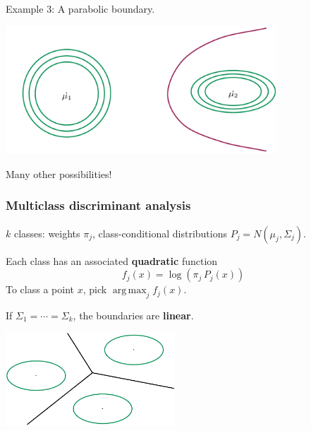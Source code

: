 \documentclass[smaller,handout]{beamer}
\def\darkred{\color{red!70!black}}
\DeclareMathOperator*{\argmax}{arg\,max}
\def\v2{{\vskip.2in}}
\begin{document}
%

\begin{frame}

{\darkred Example 3: A parabolic boundary.}

\begin{center}
\includegraphics[width=4in]{discriminant9.pdf}
\end{center}

\pause\alert{Many other possibilities!}

\end{frame}

\begin{frame}
\frametitle{Multiclass discriminant analysis}

{\darkred $k$ classes: weights $\pi_j$, class-conditional distributions $P_j = N(\mu_j, \Sigma_j)$.}

\pause\v2
Each class has an associated {\bf quadratic} function
$$ f_j(x) = \log \left( \pi_j \, P_j(x) \right) $$ 
To class a point $x$, pick $\argmax_j f_j(x)$.

\pause\v2
\alert{If $\Sigma_1 = \cdots = \Sigma_k$, the boundaries are {\bf linear}.}

\begin{center}
\includegraphics[width=2.5in]{discriminant10.pdf}
\end{center}

\end{frame}
\end{document}
